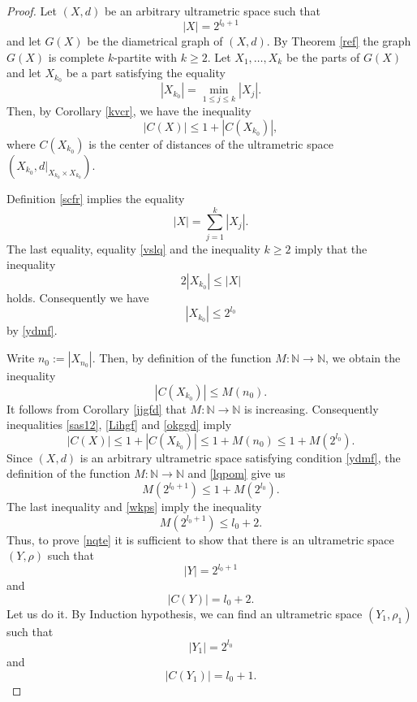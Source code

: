 \documentclass[pdflatex,sn-mathphys-num]{sn-jnl}%
\theoremstyle{thmstyleone}%
\theoremstyle{thmstyletwo}%
\theoremstyle{thmstylethree}%
\theoremstyle{thmstyletwo}%
\theoremstyle{thmstylethree}%
\begin{document}
\begin{proof}
Let $(X,d)$ be an arbitrary ultrametric space such that
\begin{equation}
|X|=2^{l_0+1}
\label{ydmf}
\end{equation}
and 
let $G(X)$ be the diametrical graph of $(X,d)$. By Theorem \ref{ref} the graph
$G(X)$ is complete $k$-partite with $k\ge2$.
Let $X_1,\dots,X_k$ be the parts of $G(X)$ and let $X_{k_0}$ be a part satisfying the equality
\begin{equation}
|X_{k_0}|=\min\limits_{1\leq j \leq k}|X_j|.
\label{vslq}
\end{equation}
Then, by Corollary \ref{kvcr},  we have the inequality
\begin{equation}
    \label{sas12}
|C(X)| \le 1 + |C(X_{k_0})|,
\end{equation}
where \(C(X_{k_0})\) is the center of distances of the ultrametric space
\(
(X_{k_0}, d|_{X_{k_0} \times X_{k_0}}).
\)

Definition \ref{scfr} implies the equality
\[
|X| = \sum_{j=1}^{k} |X_j|.
\]
The last equality, equality \eqref{vslq} and the  inequality \(k \ge 2\) imply that the inequality
\[
2|X_{k_0}| \le |X|
\]
holds.
Consequently we have
\begin{equation}
    \label{Lihgf}
|X_{k_0}| \le 2^{l_0}
\end{equation}
by \eqref{ydmf}.



Write $n_0 := |X_{n_0}|$.
Then, by definition of the function $M:\mathbb{N}\to\mathbb{N}$, we obtain the inequality
\begin{equation}
    \label{okggd}
|C(X_{k_0})| \le M(n_0). 
\end{equation}
It follows from Corollary \ref{jjgfd} that $M:\mathbb{N}\to\mathbb{N}$ is increasing. 
Consequently inequalities \eqref{sas12}, \eqref{Lihgf} and \eqref{okggd} imply
\begin{equation}\label{lqpom}
|C(X)| \le 1 + |C(X_{k_0})| \le 1 + M(n_0) \le 1 + M(2^{l_0}). 
\end{equation}
Since $(X,d)$ is an arbitrary ultrametric space satisfying condition \eqref{ydmf}, the definition of the function $M:\mathbb{N}\to\mathbb{N}$ and \eqref{lqpom} give us 
\[
M(2^{l_0+1}) \le 1 + M(2^{l_0}).
\]
The last inequality and \eqref{wkps} imply the inequality
\begin{equation}
    \label{wessmm}
M(2^{l_0+1}) \le l_0 + 2. 
\end{equation}
Thus, to prove \eqref{nqte} it is sufficient to show that there is an ultrametric space $(Y,\rho)$ such that
\begin{equation}
    \label{b1}
|Y| = 2^{l_0+1} 
\end{equation}
and
\begin{equation}
    \label{b2}
|C(Y)| = l_0 + 2. 
\end{equation}
Let us do it. By Induction hypothesis, we can find an ultrametric space $(Y_1,\rho_1)$ such that
\begin{equation}
    \label{b3}
    |Y_1|=2^{l_0}
\end{equation}
and
\begin{equation}
    \label{b4}
    |C(Y_1)|=l_0+1.
\end{equation}



\end{proof}
\end{document}
